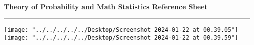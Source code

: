 \documentclass[10pt,landscape,a4paper]{article}
\newcommand{\header}{\begin{center}
		\textbf{Theory of Probability and Math Statistics Reference Sheet}
	\end{center}}
\begin{document}
	\let\displaystyle\textstyle
	\small
	\begin{multicols*}{5}
		\header
		\hrule
		
		
		
		
		
		
		
		
		\texttt{[image: "../../../../../Desktop/Screenshot 2024-01-22 at 00.39.05"]}
		\texttt{[image: "../../../../../Desktop/Screenshot 2024-01-22 at 00.39.59"]}
	\end{multicols*}
	
\end{document}
